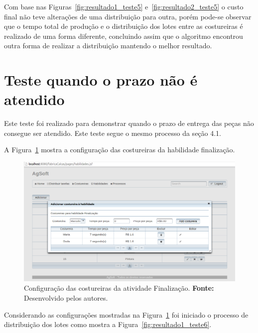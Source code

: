 \par Com base nas Figuras~\ref{fig:resultado1_teste5} e~\ref{fig:resultado2_teste5}
o custo final não teve alterações de uma distribuição para outra, porém 
pode-se observar que o tempo total de produção e o
distribuição dos lotes entre as costureiras é realizado de uma forma
diferente, concluindo assim que o algoritmo encontrou outra forma de realizar a
distribuição mantendo o melhor resultado.

\section{Teste quando o prazo não é atendido}

\par Este teste foi realizado para demonstrar quando o prazo de entrega das
peças não consegue ser atendido. Este teste segue o mesmo processo da seção 4.1.

\par A Figura~\ref{fig:configuracao_costureiras_teste6} mostra a configuração
das costureiras da habilidade finalização.

\begin{figure}[h!]
	\centerline{\includegraphics[scale=0.3]{./imagens/configuracao_costureiras_teste6.png}}
	\caption[Configuração das costureiras da atividade Finalização.] 
	{Configuração das costureiras da atividade Finalização. \textbf{Fonte:} Desenvolvido pelos
	autores.}
	\label{fig:configuracao_costureiras_teste6}
\end{figure}

\par Considerando as configurações mostradas na Figura~\ref{fig:configuracao_costureiras_teste6} foi iniciado o processo de
distribuição dos lotes como mostra a Figura~\ref{fig:resultado1_teste6}.

